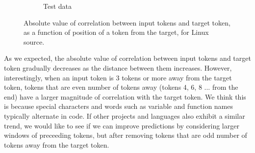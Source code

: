 \begin{figure}[h]
\begin{subfigure}{0.4\textwidth}
    \caption{Test data}
    \label{fig:correlation-test}
  \end{subfigure}
  \caption{Absolute value of correlation between input tokens and target token,
    as a function of position of a token from the target, for Linux source.}
  \label{fig:correlation}
\end{figure}

\noindent
As we expected, the absolute value of correlation between input tokens and
target token gradually decreases as the distance between them increases.
However, interestingly, when an input token is 3 tokens or more away from the
target token, tokens that are even number of tokens away (tokens 4, 6, 8 ...
from the end) have a larger magnitude of correlation with the target token.
We think this is because special characters and words such as variable and
function names typically alternate in code. If other projects and languages
also exhibit a similar trend, we would like to see if we can improve
predictions by considering larger windows of preceeding tokens, but after
removing tokens that are odd number of tokens away from the target token.
